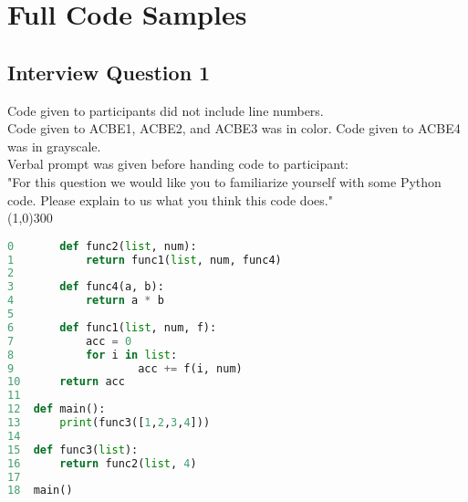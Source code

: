 \section{Full Code Samples}
\subsection{Interview Question 1} 
Code given to participants did not include line numbers. \\
Code given to ACBE1, ACBE2, and ACBE3 was in color. Code given to ACBE4 was in grayscale. \\
Verbal prompt was given before handing code to participant: \\
"For this question we would like you to familiarize yourself with some Python code.
Please explain to us what you think this code does." \\
\line(1,0){300}
\begin{lstlisting}[language=python]
0		def func2(list, num):
1			return func1(list, num, func4)
2
3		def func4(a, b):
4			return a * b
5
6		def func1(list, num, f):
7			acc = 0
8			for i in list:
9					acc += f(i, num)
10		return acc
11
12	def main():
13		print(func3([1,2,3,4]))
14
15	def func3(list):
16		return func2(list, 4)
17
18	main()

\end{lstlisting}
\newpage

